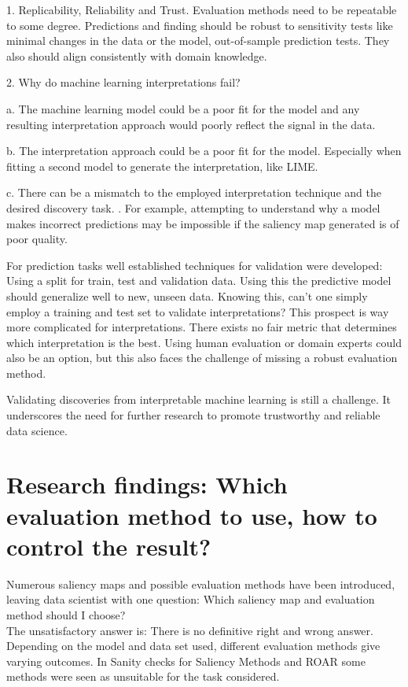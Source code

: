 1. Replicability, Reliability and Trust. Evaluation methods need to be repeatable to some degree. Predictions and finding should be robust to sensitivity tests like minimal changes in the data or the model, out-of-sample prediction tests. They also should align consistently with domain knowledge. \cite{Meng2020Reproducibility}

2. Why do machine learning interpretations fail?

a. The machine learning model could be a poor fit for the model and any resulting interpretation approach would poorly reflect the signal in the data.

b. The interpretation approach could be a poor fit for the model. Especially when fitting a second model to generate the interpretation, like LIME.

c. There can be a mismatch to the employed interpretation technique and the desired discovery task. . For example, attempting to understand why a model makes incorrect predictions may be impossible if the saliency map generated is of poor quality.

For prediction tasks well established techniques for validation were developed: Using a split for train, test and validation data. Using this the predictive model should generalize well to new, unseen data. Knowing this, can't one simply employ a training and test set to validate interpretations? \cite{allen2023interpretable} This prospect is way more complicated for interpretations. There exists no fair metric that determines which interpretation is the best. Using human evaluation or domain experts could also be an option, but this also faces the challenge of missing a robust evaluation method.

Validating discoveries from interpretable machine learning is still a challenge. It underscores the need for further research to promote trustworthy and reliable data science.

\section{Research findings: Which evaluation method to use, how to control the result?}

Numerous saliency maps and possible evaluation methods have been introduced, leaving data scientist with one question: Which saliency map and evaluation method should I choose?
\\
The unsatisfactory answer is: There is no definitive right and wrong answer. Depending on the model and data set used, different evaluation methods give varying outcomes. In Sanity checks for Saliency Methods \cite{adebayo2020sanity} and ROAR\cite{hooker2019benchmark} some methods were seen as unsuitable for the task considered.

